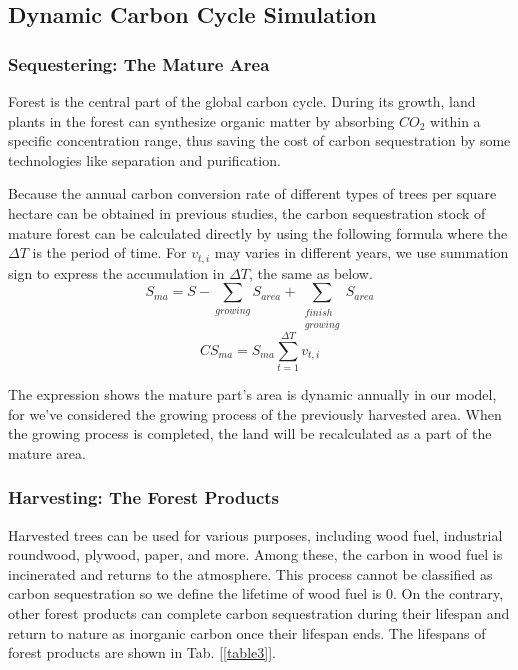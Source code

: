 \subsection{Dynamic Carbon Cycle Simulation}
\subsubsection{Sequestering: The Mature Area}
Forest is the central part of the global carbon cycle. During its growth, land plants in the forest can synthesize organic matter by absorbing $CO_2$ within a specific concentration range, thus saving the cost of carbon sequestration by some technologies like separation and purification. 

Because the annual carbon conversion rate of different types of trees per square hectare can be obtained in previous studies, the carbon sequestration stock of mature forest can be calculated directly by using the following formula where the $\Delta T$ is the period of time. 
For $v_{t,i}$ may varies in different years, we use summation sign to express the accumulation in $\Delta T$, the same as below.
\begin{equation}
S_{ma} = S-\sum_{growing}S_{area}+\sum_{\substack{finish \\ growing}}S_{area}
\end{equation}
\begin{equation}
CS_{ma} = S_{ma}\sum_{t=1}^{\Delta T}v_{t,i}
\end{equation}

The expression shows the mature part's area is dynamic annually in our model, for we've considered the growing process of the previously harvested area. When the growing process is completed, the land will be recalculated as a part of the mature area.

\subsubsection{Harvesting: The Forest Products}
Harvested trees can be used for various purposes, including wood fuel, industrial roundwood, plywood, paper, and more. Among these, the carbon in wood fuel is incinerated and returns to the atmosphere. 
This process cannot be classified as carbon sequestration so we define the lifetime of wood fuel is 0. On the contrary, other forest products can complete carbon sequestration during their lifespan and return to nature as inorganic carbon once their lifespan ends. The lifespans of forest products are shown in Tab. [\ref{table3}].

